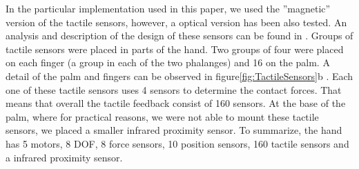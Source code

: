 In the particular implementation used in this paper, we used the
''magnetic'' version of the tactile sensors, however, a optical
version has been also tested. An analysis and description of the
design of these sensors can be found in \cite{etorresjSoft}.
Groups of tactile sensors were placed in parts of the hand. Two
groups of four were placed on each finger (a group in each of the
two phalanges) and 16 on the palm. A detail of the palm and
fingers can be observed in figure\ref{fig:TactileSensors}b . Each
one of these tactile sensors uses 4 sensors to determine the
contact forces. That means that overall the tactile feedback
consist of 160 sensors. At the base of the palm, where for
practical reasons, we were not able to mount these tactile
sensors, we placed a smaller infrared proximity sensor. To
summarize, the hand has 5 motors, 8 DOF, 8 force sensors, 10
position sensors, 160 tactile sensors and a infrared proximity
sensor.
